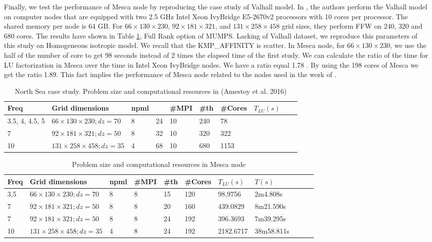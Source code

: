 Finally, we test the performance of Mesca node by reproducing the case study of Valhall model. In \cite{Amestoy2016}, the authors perform the Valhall model on computer nodes that are equipped with two 2.5 GHz Intel Xeon IvyBridge E5-2670v2 processors with 10 cores per processor. The shared memory per node is 64 GB. For $ 66 \times 130 \times 230$, $ 92 \times 181 \times 321$, and $ 131 \times 258 \times 458$ grid sizes, they perform FFW on 240, 320 and 680 cores. The results have shown in Table \ref{amestoy}, Full Rank option of MUMPS. Lacking of Valhall dataset, we reproduce this parameters of this study on Homogeneous isotropic model. We recall that the KMP\_AFFINITY is scatter. In Mesca node, for $ 66 \times 130 \times 230$, we use the half of the number of core to get 98 seconds instead of 2 times the elapsed time of the first study. We can calculate the ratio of the time for LU factorization in Mesca over the time in Intel Xeon IvyBridge nodes. We have a ratio equal 1.78 . By using the 198 cores of Mesca we get the ratio 1.89. This fact implies the performance of Mesca node related to the nodes used in the work of \cite{Amestoy2016}.   

\begin{table}[!h]
\centering
\begin{tabular}{llllllllll}
Freq & Grid dimensions & npml &  & \#MPI & \#th & \#Cores & $T_{LU}(s)$  \\
 \hline
3.5, 4, 4.5, 5 & $ 66 \times 130 \times 230; dz=70$ & 8 & 24 & 10 & 240 & 78 \\
7 &	$ 92 \times 181 \times 321; dz=50 $ &	8 & 32 & 10	& 320 & 322 \\
10 & $ 131 \times 258 \times 458; dz=35$ &	4 &	68 & 10	& 680 &	1153
\end{tabular}
\caption{North Sea case study. Problem size and computational resources in (Amestoy et al. 2016)}
\label{amestoy}
\end{table}

\begin{table}[!h]
\centering

\begin{tabular}{lllllllllll}
Freq & Grid dimensions & npml & \#MPI & \#th & \#Cores & $T_{LU}(s)$ & $ T(s)$ \\
 \hline
3,5	& $ 66 \times 130 \times 230; dz=70$ &	8 &	8 &	15 &	120 &	98,9756 & 2m4.808s  \\
7	& $ 92 \times 181 \times 321; dz=50 $ & 8 & 8 & 20 &	160	& 439.0829 & 8m21.590s  \\
7	& $ 92\times 181 \times 321; dz=50 $ &	8 &	8 &	24 &	192	& 396.3693 & 7m39.295s	 \\							
10	& $ 131 \times 258 \times 458; dz=35$ &	4	& 8 &	24 & 192	 & 2182.6717 &	38m58.811s
\end{tabular}
\caption{Problem size and computational resources in Mesca node}
\label{amestoyMesca}
\end{table}

